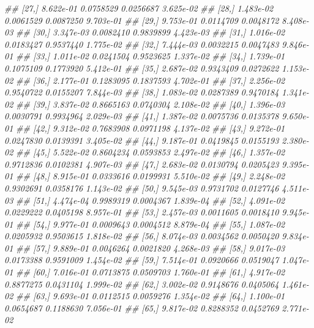 \documentclass[
  notitlepage]{book}
\newenvironment{Shaded}{\begin{snugshade}}{\end{snugshade}}
\newcommand{\CommentTok}[1]{\textcolor[rgb]{0.56,0.35,0.01}{\textit{#1}}}
\begin{document}
\begin{Shaded}
\begin{Highlighting}[]
\CommentTok{\#\# [27,] 8.622e{-}01 0.0758529 0.0256687 3.625e{-}02}
\CommentTok{\#\# [28,] 1.483e{-}02 0.0061529 0.0087250 9.703e{-}01}
\CommentTok{\#\# [29,] 9.753e{-}01 0.0114709 0.0048172 8.408e{-}03}
\CommentTok{\#\# [30,] 3.347e{-}03 0.0082410 0.9839899 4.423e{-}03}
\CommentTok{\#\# [31,] 1.016e{-}02 0.0183427 0.9537440 1.775e{-}02}
\CommentTok{\#\# [32,] 7.444e{-}03 0.0032215 0.0047483 9.846e{-}01}
\CommentTok{\#\# [33,] 1.011e{-}02 0.0241504 0.9523625 1.337e{-}02}
\CommentTok{\#\# [34,] 1.739e{-}01 0.1075109 0.1773920 5.412e{-}01}
\CommentTok{\#\# [35,] 2.687e{-}02 0.9343409 0.0272622 1.153e{-}02}
\CommentTok{\#\# [36,] 2.177e{-}01 0.1283095 0.1837593 4.702e{-}01}
\CommentTok{\#\# [37,] 2.256e{-}02 0.9540722 0.0155207 7.844e{-}03}
\CommentTok{\#\# [38,] 1.083e{-}02 0.0287389 0.9470184 1.341e{-}02}
\CommentTok{\#\# [39,] 3.837e{-}02 0.8665163 0.0740304 2.108e{-}02}
\CommentTok{\#\# [40,] 1.396e{-}03 0.0030791 0.9934964 2.029e{-}03}
\CommentTok{\#\# [41,] 1.387e{-}02 0.0075736 0.0135378 9.650e{-}01}
\CommentTok{\#\# [42,] 9.312e{-}02 0.7683908 0.0971198 4.137e{-}02}
\CommentTok{\#\# [43,] 9.272e{-}01 0.0247830 0.0139391 3.405e{-}02}
\CommentTok{\#\# [44,] 9.187e{-}01 0.0419845 0.0155193 2.380e{-}02}
\CommentTok{\#\# [45,] 5.522e{-}02 0.8604234 0.0593853 2.497e{-}02}
\CommentTok{\#\# [46,] 1.357e{-}02 0.9712836 0.0102381 4.907e{-}03}
\CommentTok{\#\# [47,] 2.683e{-}02 0.0130794 0.0205423 9.395e{-}01}
\CommentTok{\#\# [48,] 8.915e{-}01 0.0333616 0.0199931 5.510e{-}02}
\CommentTok{\#\# [49,] 2.248e{-}02 0.9302691 0.0358176 1.143e{-}02}
\CommentTok{\#\# [50,] 9.545e{-}03 0.9731702 0.0127746 4.511e{-}03}
\CommentTok{\#\# [51,] 4.474e{-}04 0.9989319 0.0004367 1.839e{-}04}
\CommentTok{\#\# [52,] 4.091e{-}02 0.0229222 0.0405198 8.957e{-}01}
\CommentTok{\#\# [53,] 2.457e{-}03 0.0011605 0.0018410 9.945e{-}01}
\CommentTok{\#\# [54,] 9.977e{-}01 0.0009643 0.0004512 8.879e{-}04}
\CommentTok{\#\# [55,] 1.087e{-}02 0.0205932 0.9503615 1.818e{-}02}
\CommentTok{\#\# [56,] 8.074e{-}03 0.0034562 0.0050420 9.834e{-}01}
\CommentTok{\#\# [57,] 9.889e{-}01 0.0046264 0.0021820 4.268e{-}03}
\CommentTok{\#\# [58,] 9.017e{-}03 0.0173388 0.9591009 1.454e{-}02}
\CommentTok{\#\# [59,] 7.514e{-}01 0.0920666 0.0519047 1.047e{-}01}
\CommentTok{\#\# [60,] 7.016e{-}01 0.0713875 0.0509703 1.760e{-}01}
\CommentTok{\#\# [61,] 4.917e{-}02 0.8877275 0.0431104 1.999e{-}02}
\CommentTok{\#\# [62,] 3.002e{-}02 0.9148676 0.0405064 1.461e{-}02}
\CommentTok{\#\# [63,] 9.693e{-}01 0.0112515 0.0059276 1.354e{-}02}
\CommentTok{\#\# [64,] 1.100e{-}01 0.0654687 0.1188630 7.056e{-}01}
\CommentTok{\#\# [65,] 9.817e{-}02 0.8288352 0.0452769 2.771e{-}02}

\end{Highlighting}
\end{Shaded}
\end{document}
